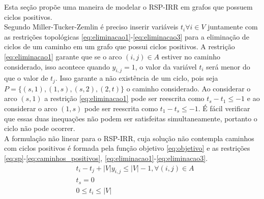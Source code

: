 Esta seção propõe uma maneira de modelar o RSP-IRR em grafos que possuem ciclos positivos.\\
Segundo Miller-Tucker-Zemlin \cite{MTZ1991} é preciso inserir variáveis $t_i \forall i \in V$ juntamente com as restrições topológicas \eqref{eq:eliminacao1}-\eqref{eq:eliminacao3} 
para a eliminação de ciclos de um caminho em um grafo que possui ciclos positivos. A restrição \eqref{eq:eliminacao1} garante que se o arco $(i,j) \in A$ 
estiver no caminho considerado, isso acontece quando $y_{i,j} = 1$, o valor da variável $t_i$ será menor do que o valor de $t_j$. Isso garante a 
não existência de um ciclo, pois seja $P = \{(s,1),(1,s),(s,2),(2,t)\}$ o caminho considerado. Ao considerar o arco $(s,1)$ a restrição \eqref{eq:eliminacao1}
pode ser reescrita como $t_s - t_1 \leq -1$ e ao considerar o arco $(1,s)$ pode ser reescrita como $t_1 - t_s \leq -1$. É fácil verificar que essas duas
inequações não podem ser satisfeitas simultaneamente, portanto o ciclo não pode ocorrer. \\
A formulação não linear para o RSP-IRR, cuja solução não contempla caminhos com ciclos 
positivos é formada pela função objetivo \eqref{eq:objetivo} e as restrições 
\eqref{eq:sp}-\eqref{eq:caminhos_positivos}, \eqref{eq:eliminacao1}-\eqref{eq:eliminacao3}.
\begin{align}
    & t_i - t_j + |V|y_{i,j} \leq |V| - 1, \forall (i,j) \in A \label{eq:eliminacao1} \\
    & t_s = 0 \label{eq:eliminacao2} \\
    & 0 \leq t_i \leq |V| \label{eq:eliminacao3}
\end{align}